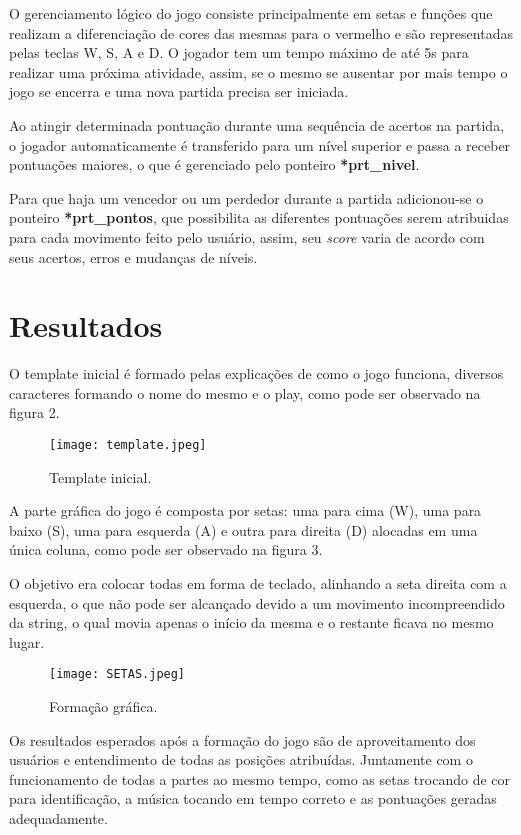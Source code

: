 \documentclass[journal]{IEEEtran}
\begin{document}
O gerenciamento lógico do jogo consiste principalmente em setas e funções que realizam a diferenciação de cores das mesmas para o vermelho e são representadas pelas teclas W, S, A e D. O jogador tem um tempo máximo de até 5s para realizar uma próxima atividade, assim, se o mesmo se ausentar por mais tempo o jogo se encerra e uma nova partida precisa ser iniciada.

Ao atingir determinada pontuação durante uma sequência de acertos na partida, o jogador automaticamente é transferido para um nível superior e passa a receber pontuações maiores, o que é gerenciado pelo ponteiro \textbf{*prt\_nivel}.

Para que haja um vencedor ou um perdedor durante a partida adicionou-se o ponteiro \textbf{*prt\_pontos}, que possibilita as diferentes pontuações serem atribuidas para cada movimento feito pelo usuário, assim, seu \textit{score} varia de acordo com seus acertos, erros e mudanças de níveis. 

\section{Resultados}

O template inicial é formado pelas explicações de como o jogo funciona, diversos caracteres formando o nome do mesmo e o play, como pode ser observado na figura 2.

\begin{figure}[h]
    \centering
    \texttt{[image: template.jpeg]}
    \caption{Template inicial.}
    \label{fig:template}
\end{figure}

A parte gráfica do jogo é composta por setas: uma para cima (W), uma para baixo (S), uma para esquerda (A) e outra para direita (D) alocadas em uma única coluna, como pode ser observado na figura 3. 

O objetivo era colocar todas em forma de teclado, alinhando a seta direita com a esquerda, o que não pode ser alcançado devido a um movimento incompreendido da string, o qual movia apenas o início da mesma e o restante ficava no mesmo lugar.

\begin{figure}[h]
    \centering
    \texttt{[image: SETAS.jpeg]}
    \caption{Formação gráfica.}
    \label{fig:setas}
\end{figure}

Os resultados esperados após a formação do jogo são de aproveitamento dos usuários e entendimento de todas as posições atribuídas. Juntamente com o funcionamento de todas a partes ao mesmo tempo, como as setas trocando de cor para identificação, a música tocando em tempo correto e as pontuações geradas adequadamente.
\end{document}
